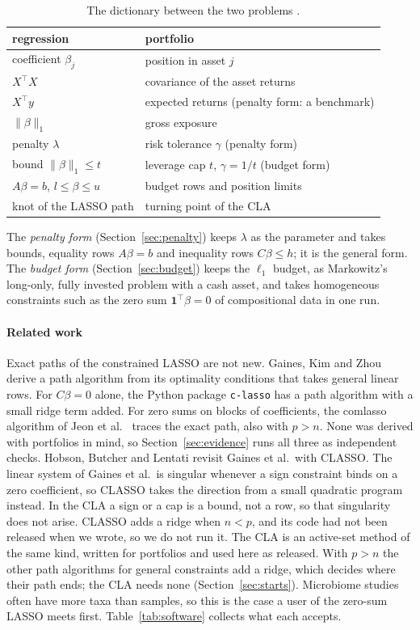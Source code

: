 \documentclass[11pt]{article}
\theoremstyle{remark}
\newcommand{\trans}{^{\top}}
\newcommand{\one}{\mathbf{1}}
\begin{document}
\begin{table}[t]
\centering
\small
\begin{tabular}{ll}
\toprule
regression & portfolio \\
\midrule
coefficient $\beta_j$ & position in asset $j$ \\
$X\trans X$ & covariance of the asset returns \\
$X\trans y$ & expected returns (penalty form: a benchmark) \\
$\|\beta\|_1$ & gross exposure \\
penalty $\lambda$ & risk tolerance $\gamma$ (penalty form) \\
bound $\|\beta\|_1\le t$ & leverage cap $t$, $\gamma=1/t$ (budget form) \\
$A\beta=b$, $l\le\beta\le u$ & budget rows and position limits \\
knot of the LASSO path & turning point of the CLA \\
\bottomrule
\end{tabular}
\caption{The dictionary between the two problems \cite{perspective}.}
\label{tab:dictionary}
\end{table}

The \emph{penalty form} (Section~\ref{sec:penalty}) keeps $\lambda$ as the parameter and
takes bounds, equality rows $A\beta=b$ and inequality rows $C\beta\le h$; it is the
general form. The \emph{budget form} (Section~\ref{sec:budget}) keeps the $\ell_1$
budget, as Markowitz's long-only, fully invested problem with a cash asset, and takes
homogeneous constraints such as the zero sum $\one\trans\beta=0$ of compositional data
in one run.

\paragraph{Related work} Exact paths of the constrained LASSO are not new. Gaines, Kim
and Zhou \cite{gaines2018} derive a path algorithm from its optimality conditions that
takes general linear rows. For $C\beta=0$ alone, the Python package \texttt{c-lasso}
\cite{classo} has a path algorithm with a small ridge term added. For zero sums on
blocks of coefficients, the comlasso algorithm of Jeon et al.\ \cite{jeon2020} traces the
exact path, also with $p>n$. None was derived with portfolios in mind, so
Section~\ref{sec:evidence} runs all three as independent checks. Hobson, Butcher and
Lentati \cite{hobson2026} revisit Gaines et al.\ with CLASSO. The linear system of
Gaines et al.\ is singular whenever a sign constraint binds on a zero coefficient, so
CLASSO takes the direction from a small quadratic program instead. In the CLA a sign or a cap is a
bound, not a row, so that singularity does not arise. CLASSO adds a ridge when $n<p$,
and its code had not been released when we wrote, so we do not run it. The CLA is an
active-set method of the same kind, written for portfolios and used here as released.
With $p>n$ the other path algorithms for general constraints add a ridge, which
decides where their path ends; the CLA needs none (Section~\ref{sec:starts}). Microbiome
studies often have more taxa than samples, so this is the case a user of the zero-sum
LASSO meets first. Table~\ref{tab:software} collects what each accepts.
\end{document}
